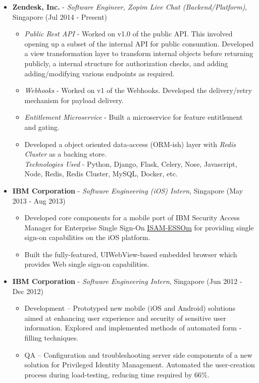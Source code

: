 \begin{itemize}
\tightlist
\item
  \textbf{Zendesk, Inc.} - \emph{Software Engineer, Zopim Live Chat
  (Backend/Platform)}, Singapore \hfill (Jul 2014 - Present)

  \begin{itemize}
  \tightlist
  \item
    \emph{Public Rest API} - Worked on v1.0 of the public API. This
    involved opening up a subset of the internal API for public
    consumtion. Developed a view transformation layer to transform
    internal objects before returning publicly, a internal structure for
    authorization checks, and adding adding/modifying various endpoints
    as required.
  \item
    \emph{Webhooks} - Worked on v1 of the Webhooks. Developed the
    delivery/retry mechanism for payload delivery.
  \item
    \emph{Entitlement Microservice} - Built a microservice for feature
    entitlement and gating.
  \item
    Developed a object oriented data-access (ORM-ish) layer with
    \emph{Redis Cluster} as a backing store.\\
    \emph{Technologies Used} - Python, Django, Flask, Celery, Nose,
    Javascript, Node, Redis, Redis Cluster, MySQL, Docker, etc.
  \end{itemize}
\item
  \textbf{IBM Corporation} - \emph{Software Engineering (iOS) Intern},
  Singapore \hfill (May 2013 - Aug 2013)

  \begin{itemize}
  \tightlist
  \item
    Developed core components for a mobile port of IBM Security Access
    Manager for Enterprise Single Sign-On
    \href{https://itunes.apple.com/us/app/isam-essom/id741972716?mt=8}{ISAM-ESSOm}
    for providing single sign-on capabilities on the iOS platform.
  \item
    Built the fully-featured, UIWebView-based embedded browser which
    provides Web single sign-on capabilities.
  \end{itemize}
\item
  \textbf{IBM Corporation} - \emph{Software Engineering Intern},
  Singapore \hfill (Jun 2012 - Dec 2012)

  \begin{itemize}
  \tightlist
  \item
    Development -- Prototyped new mobile (iOS and Android) solutions
    aimed at enhancing user experience and security of sensitive user
    information. Explored and implemented methods of automated form -
    filling techniques.
  \item
    QA -- Configuration and troubleshooting server side components of a
    new solution for Privileged Identity Management. Automated the
    user-creation process during load-testing, reducing time required by
    66\%.
  \end{itemize}
\end{itemize}

